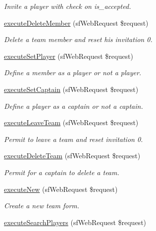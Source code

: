 \begin{DoxyCompactItemize}
\begin{DoxyCompactList}\small\item\em Invite a player with check on is\-\_\-accepted. \end{DoxyCompactList}\item 
\hyperlink{classteam_actions_af539d6f2cdc9f9acae9c7e25b125bc17}{execute\-Delete\-Member} (sf\-Web\-Request \$request)
\begin{DoxyCompactList}\small\item\em Delete a team member and reset his invitation 0. \end{DoxyCompactList}\item 
\hyperlink{classteam_actions_a789d34a9f506e5aa7de58305679bb480}{execute\-Set\-Player} (sf\-Web\-Request \$request)
\begin{DoxyCompactList}\small\item\em Define a member as a player or not a player. \end{DoxyCompactList}\item 
\hyperlink{classteam_actions_a1eaacff66375d0cbdfb4efb692ad7724}{execute\-Set\-Captain} (sf\-Web\-Request \$request)
\begin{DoxyCompactList}\small\item\em Define a player as a captain or not a captain. \end{DoxyCompactList}\item 
\hyperlink{classteam_actions_ad6507da6f2e416d60d6597f158a1776e}{execute\-Leave\-Team} (sf\-Web\-Request \$request)
\begin{DoxyCompactList}\small\item\em Permit to leave a team and reset invitation 0. \end{DoxyCompactList}\item 
\hyperlink{classteam_actions_ab50f30ef5956b4584470b35fee824e01}{execute\-Delete\-Team} (sf\-Web\-Request \$request)
\begin{DoxyCompactList}\small\item\em Permit for a captain to delete a team. \end{DoxyCompactList}\item 
\hyperlink{classteam_actions_a0ffbea56560c6c633dae68ec22aff21c}{execute\-New} (sf\-Web\-Request \$request)
\begin{DoxyCompactList}\small\item\em Create a new team form. \end{DoxyCompactList}\item 
\hyperlink{classteam_actions_af5410dd135aa387655909ccac7ff0f0c}{execute\-Search\-Players} (sf\-Web\-Request \$request)

\end{DoxyCompactItemize}

